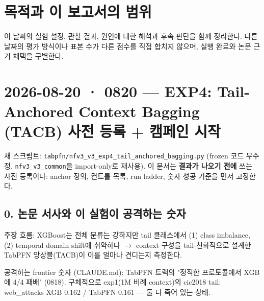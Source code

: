 




\section*{목적과 이 보고서의 범위}

이 날짜의 실험 설정, 관찰 결과, 원인에 대한 해석과 후속 판단을 함께 정리한다. 다른 날짜의 평가 방식이나 표본 수가 다른 점수를 직접 합치지 않으며, 실행 완료와 논문 근거 채택을 구별한다.


\section{2026-08-20 · 0820 — EXP4: Tail-Anchored Context Bagging (TACB) 사전 등록 +\allowbreak{} 캠페인 시작}
\label{report:20260820_0820}
새 스크립트: \texttt{tabpfn/\allowbreak{}\allowbreak{}n\allowbreak{}fv3\_\allowbreak{}\allowbreak{}v3\_\allowbreak{}\allowbreak{}e\allowbreak{}xp4\_\allowbreak{}\allowbreak{}tail\allowbreak{}\_\allowbreak{}\allowbreak{}anchore\allowbreak{}d\_\allowbreak{}\allowbreak{}baggin\allowbreak{}g.\allowbreak{}py} (frozen 코드 무수정, \texttt{nfv3\_\allowbreak{}\allowbreak{}v3\_\allowbreak{}\allowbreak{}common}을 import-only로 재사용). 이 문서는 \textbf{결과가 나오기 전에} 쓰는 사전 등록이다: anchor 정의, 컨트롤 목록, run ladder, 숫자 성공 기준을 먼저 고정한다.

\subsection{0. 논문 서사와 이 실험이 공격하는 숫자}
주장 흐름: XGBoost는 전체 분류는 강하지만 tail 클래스에서 (1) class imbalance, (2) temporal domain shift에 취약하다  \ensuremath{\rightarrow}  context 구성을 tail-친화적으로 설계한 TabPFN 앙상블(TACB)이 이를 얼마나 견디는지 측정한다.

공격하는 frontier 숫자 (CLAUDE.md): TabPFN 트랙의 "정직한 프로토콜에서 XGB에 4/\allowbreak{}4 패배" (0818). 구체적으로 exp1(1M 비례 context)의 cic2018 tail: web\_\allowbreak{}attacks XGB 0.162 /\allowbreak{} TabPFN 0.161 — 둘 다 죽어 있는 상태.

